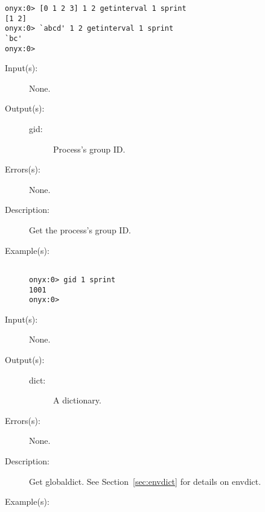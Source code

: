 \begin{description}
\begin{description}
\begin{verbatim}
onyx:0> [0 1 2 3] 1 2 getinterval 1 sprint
[1 2]
onyx:0> `abcd' 1 2 getinterval 1 sprint
`bc'
onyx:0>
		\end{verbatim}
	\end{description}
\label{systemdict:gid}
\item[{\onyxop{--}{gid}{gid}}: ]
	\begin{description}\item[]
	\item[Input(s): ] None.
	\item[Output(s): ]
		\begin{description}\item[]
		\item[gid: ]
			Process's group ID.
		\end{description}
	\item[Errors(s): ] None.
	\item[Description: ]
		Get the process's group ID.
	\item[Example(s): ]\begin{verbatim}

onyx:0> gid 1 sprint
1001
onyx:0>
		\end{verbatim}
	\end{description}
\label{systemdict:globaldict}
\item[{\onyxop{--}{globaldict}{dict}}: ]
	\begin{description}\item[]
	\item[Input(s): ] None.
	\item[Output(s): ]
		\begin{description}\item[]
		\item[dict: ]
			A dictionary.
		\end{description}
	\item[Errors(s): ] None.
	\item[Description: ]
		Get globaldict.  See Section~\ref{sec:envdict} for details on
		envdict.
	\item[Example(s): ]\begin{verbatim}


\end{verbatim}
\end{description}
\end{description}
